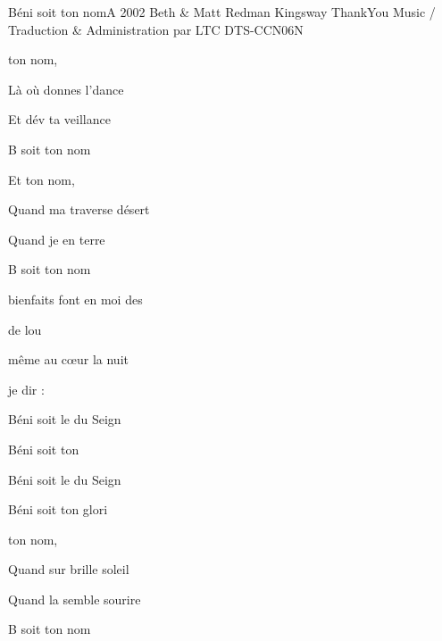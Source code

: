 \begin{song}{B\'eni soit ton nom}{A}
  {2002 Beth \& Matt Redman}
  {Kingsway ThankYou Music / Traduction \& Administration par LTC}
  {}
  {DTS-CCN06N}


	\begin{SBVerse}


  ton nom,

L\`a o\`u  donnes l'dance

Et d\'ev ta veillance

B soit ton nom 



Et   ton nom,

Quand ma  traverse  d\'esert

Quand je  en terre 

B soit ton nom 

	\end{SBVerse}



	\begin{SBChorus}


 bienfaits font  en moi des

 de lou

 m\^eme au c\oe{}ur  la nuit

 je dir :

B\'eni soit le  du Seign

B\'eni soit ton 

B\'eni soit le  du Seign

B\'eni soit ton  glori

	\end{SBChorus}

	\begin{SBVerse}

  ton nom,

Quand sur  brille  soleil

Quand la  semble  sourire

B soit ton nom 




\end{SBVerse}
\end{song}
